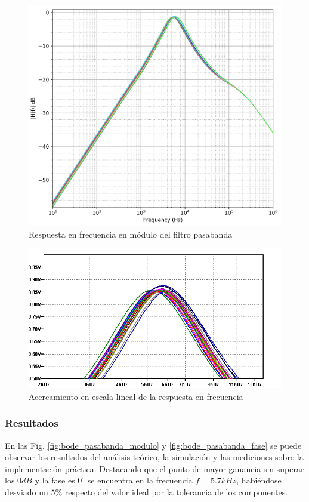 \begin{figure}[H]
    \centering
        \includegraphics[scale=0.12]{../EJ2/Recursos/bd_montecarlo.png}    
    \caption{Respuesta en frecuencia en m\'odulo del filtro pasabanda}
    \label{fig:bd_montecarlo}
\end{figure}

\begin{figure}[H]
    \centering
        \includegraphics[scale=0.6]{../EJ2/Recursos/bp_montecarlo_frecuencia.png}
    \caption{Acercamiento en escala lineal de la respuesta en frecuencia}
    \label{fig:bp_montecarlo_frecuencia}
\end{figure}

\subsubsection{Resultados}
En las Fig. \ref{fig:bode_pasabanda_modulo} y \ref{fig:bode_pasabanda_fase} se puede observar los resultados del an\'alisis te\'orico, la simulaci\'on y las mediciones sobre la implementaci\'on
pr\'actica. Destacando que el punto de mayor ganancia sin superar los $0dB$ y la fase es $0^{\circ}$ se encuentra en la frecuencia $f = 5.7kHz$, habi\'endose desviado un $5\%$ respecto del valor ideal
por la tolerancia de los componentes.

